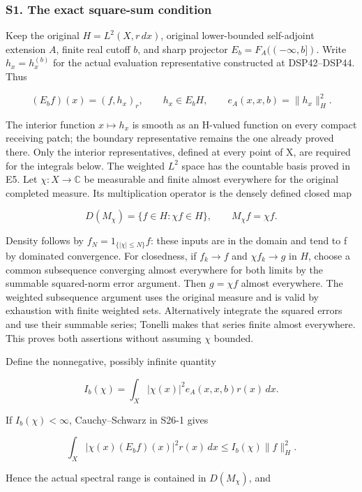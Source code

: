 \documentclass[
  11pt,
]{article}
\makeatletter
\let\ReaderOriginalAnchorStart\hyper@anchorstart
\let\ReaderOriginalAnchorEnd\hyper@anchorend
\let\ReaderPendingAliases\@empty
\def\ReaderArmAliases#1{\gdef\ReaderPendingAliases{#1}}
\def\hyper@anchorstart#1{\ReaderIfNativeAnchorTF{#1}{\ReaderPendingAliases\global\let\ReaderPendingAliases\@empty}{}\ReaderOriginalAnchorStart{#1}}
\makeatother
\begin{document}
\ReaderArmAliases{\ReaderOriginalAnchorStart{s1.-the-exact-square-sum-condition}\ReaderOriginalAnchorEnd}
\subsubsection{S1. The exact square-sum
condition}\label{s1.-the-exact-square-sum-condition}

Keep the original \(H=L^2(X,r\,dx)\), original lower-bounded
self-adjoint extension \(A\), finite real cutoff \(b\), and sharp
projector \(E_b=F_A(( -\infty,b])\). Write \(h_x=h_x^{(b)}\) for the
actual evaluation representative constructed at DSP42--DSP44. Thus

\[
(E_bf)(x)=(f,h_x)_r,\qquad h_x\in E_bH,\qquad
e_A(x,x,b)=\|h_x\|_H^2.
\tag{S26-1}
\]

The interior function \(x\mapsto h_x\) is smooth as an H-valued function
on every compact receiving patch; the boundary representative remains
the one already proved there. Only the interior representatives, defined
at every point of X, are required for the integrals below. The weighted
\(L^2\) space has the countable basis proved in E5. Let
\(\chi:X\to\mathbb C\) be measurable and finite almost everywhere for
the original completed measure. Its multiplication operator is the
densely defined closed map

\[
D(M_\chi)=\{f\in H:\chi f\in H\},\qquad
M_\chi f=\chi f.
\tag{S26-2}
\]

Density follows by \(f_N=1_{\{|\chi|\le N\}}f\): these inputs are in the
domain and tend to f by dominated convergence. For closedness, if
\(f_k\to f\) and \(\chi f_k\to g\) in \(H\), choose a common subsequence
converging almost everywhere for both limits by the summable
squared-norm error argument. Then \(g=\chi f\) almost everywhere. The
weighted subsequence argument uses the original measure and is valid by
exhaustion with finite weighted sets. Alternatively integrate the
squared errors and use their summable series; Tonelli makes that series
finite almost everywhere. This proves both assertions without assuming
\(\chi\) bounded.

Define the nonnegative, possibly infinite quantity

\[
I_b(\chi)=\int_X|\chi(x)|^2e_A(x,x,b)r(x)\,dx.
\tag{S26-3}
\]

If \(I_b(\chi)<\infty\), Cauchy--Schwarz in S26-1 gives

\[
\int_X|\chi(x)(E_bf)(x)|^2r(x)\,dx
\le I_b(\chi)\|f\|_H^2.
\tag{S26-4}
\]

Hence the actual spectral range is contained in \(D(M_\chi)\), and
\end{document}

